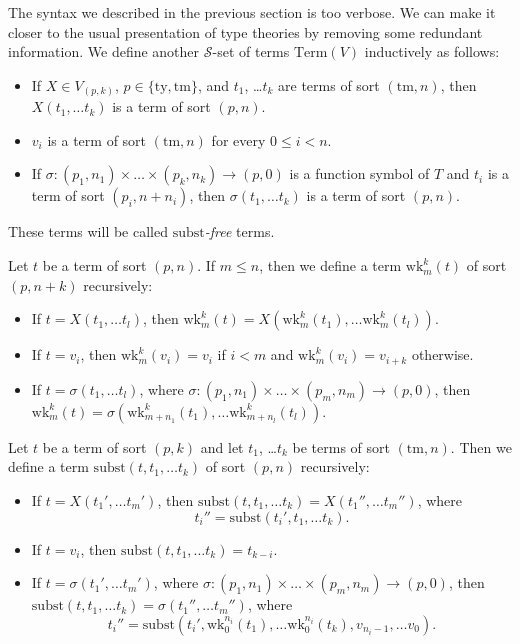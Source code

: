 \documentclass[reqno]{amsart}
\theoremstyle{definition}
\theoremstyle{remark}
\newcommand{\fs}[1]{\mathrm{#1}}
\newcommand{\Term}{\fs{Term}}
\newcommand{\subst}{\fs{subst}}
\newcommand{\wk}{\fs{wk}}
\newcommand{\ty}{\fs{ty}}
\newcommand{\tm}{\fs{tm}}
\numberwithin{figure}{section}
\begin{document}
The syntax we described in the previous section is too verbose.
We can make it closer to the usual presentation of type theories by removing some redundant information.
We define another $\mathcal{S}$-set of terms $\Term(V)$ inductively as follows:
\begin{itemize}
\item If $X \in V_{(p,k)}$, $p \in \{ \ty, \tm \}$, and $t_1$, \ldots $t_k$ are terms of sort $(\tm,n)$, then $X(t_1, \ldots t_k)$ is a term of sort $(p,n)$.
\item $v_i$ is a term of sort $(\tm,n)$ for every $0 \leq i < n$.
\item If $\sigma : (p_1,n_1) \times \ldots \times (p_k,n_k) \to (p,0)$ is a function symbol of $T$ and $t_i$ is a term of sort $(p_i,n+n_i)$, then $\sigma(t_1, \ldots t_k)$ is a term of sort $(p,n)$.
\end{itemize}
These terms will be called \emph{$\subst$-free} terms.

Let $t$ be a term of sort $(p,n)$.
If $m \leq n$, then we define a term $\wk^k_m(t)$ of sort $(p,n+k)$ recursively:
\begin{itemize}
\item If $t = X(t_1, \ldots t_l)$, then $\wk^k_m(t) = X(\wk^k_m(t_1), \ldots \wk^k_m(t_l))$.
\item If $t = v_i$, then $\wk^k_m(v_i) = v_i$ if $i < m$ and $\wk^k_m(v_i) = v_{i+k}$ otherwise.
\item If $t = \sigma(t_1, \ldots t_l)$, where $\sigma : (p_1,n_1) \times \ldots \times (p_m,n_m) \to (p,0)$, then $\wk^k_m(t) = \sigma(\wk^k_{m+n_1}(t_1), \ldots \wk^k_{m+n_l}(t_l))$.
\end{itemize}

Let $t$ be a term of sort $(p,k)$ and let $t_1$, \ldots $t_k$ be terms of sort $(\tm,n)$.
Then we define a term $\subst(t, t_1, \ldots t_k)$ of sort $(p,n)$ recursively:
\begin{itemize}
\item If $t = X(t_1', \ldots t_m')$, then $\subst(t, t_1, \ldots t_k) = X(t_1'', \ldots t_m'')$, where
\[ t_i'' = \subst(t_i', t_1, \ldots t_k). \]
\item If $t = v_i$, then $\subst(t, t_1, \ldots t_k) = t_{k-i}$.
\item If $t = \sigma(t_1', \ldots t_m')$, where $\sigma : (p_1,n_1) \times \ldots \times (p_m,n_m) \to (p,0)$, then $\subst(t, t_1, \ldots t_k) = \sigma(t_1'', \ldots t_m'')$, where
\[ t_i'' = \subst(t_i', \wk^{n_i}_0(t_1), \ldots \wk^{n_i}_0(t_k), v_{n_i-1}, \ldots v_0). \]
\end{itemize}
\end{document}
